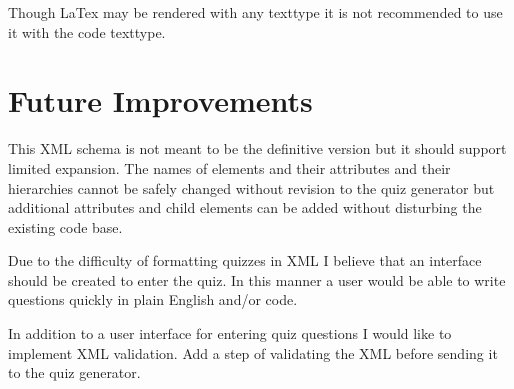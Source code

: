 \documentclass{article}
\begin{document}
	Though LaTex may be rendered with any texttype it is not recommended to use it with the code texttype.
		
	\section{Future Improvements}
	This XML schema is not meant to be the definitive version but it should support limited expansion. The names of elements and their attributes and their hierarchies cannot be safely changed without revision to the quiz generator but additional attributes and child elements can be added without disturbing the existing code base.

	Due to the difficulty of formatting quizzes in XML I believe that an interface 	should be created to enter the quiz. In this manner a user would be able to write questions quickly in plain English and/or code. 
	
	In addition to a user interface for entering quiz questions I would like to implement XML validation. Add a step of validating the XML before sending it to the quiz generator.
\end{document}
